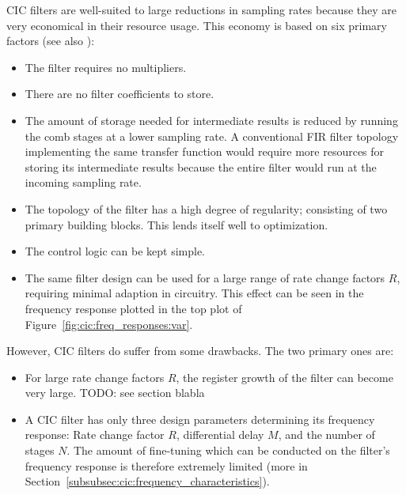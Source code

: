CIC filters are well-suited to large reductions in sampling rates because they
are very  economical in  their resource  usage. This economy  is based  on six
primary factors (see also \cite{1163535}):
\begin{itemize}\tightlist
    \item
        The filter requires no multipliers.
    \item
        There are no filter coefficients to store.
    \item
        The amount  of storage needed  for intermediate results is  reduced by
        running the comb  stages at a lower sampling  rate. A conventional FIR
        filter topology implementing the  same transfer function would require
        more resources for storing its intermediate results because the entire
        filter would run at the incoming sampling rate.
    \item
        The  topology  of  the  filter   has  a  high  degree  of  regularity;
        consisting of two  primary building blocks. This lends  itself well to
        optimization.
    \item
        The control logic can be kept simple.
    \item
        The  same  filter  design can  be  used  for  a  large range  of  rate
        change  factors $R$,  requiring  minimal  adaption in  circuitry. This
        effect  can be  seen  in the  frequency response  plotted  in the  top
        plot of  Figure~\ref{fig:cic:freq_responses:var}.
\end{itemize}

However, CIC filters do suffer from some drawbacks. The two primary ones are:
\begin{itemize}\tightlist
    \item
        For large rate  change factors $R$, the register growth  of the filter
        can become very large. TODO: see section blabla
    \item
        A   CIC  filter   has   only  three   design  parameters   determining
        its   frequency  response: Rate   change   factor  $R$,   differential
        delay   $M$,    and   the    number   of   stages    $N$. The   amount
        of   fine-tuning   which   can    be   conducted   on   the   filter's
        frequency   response  is   therefore   extremely   limited  (more   in
        Section~\ref{subsubsec:cic:frequency_characteristics}).
\end{itemize}



